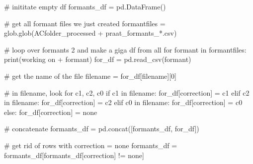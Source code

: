 \documentclass[
  letterpaper,
  DIV=11,
  numbers=noendperiod]{scrreprt}
\newenvironment{Shaded}{\begin{snugshade}}{\end{snugshade}}
\newcommand{\BuiltInTok}[1]{\textcolor[rgb]{0.00,0.23,0.31}{#1}}
\newcommand{\CommentTok}[1]{\textcolor[rgb]{0.37,0.37,0.37}{#1}}
\newcommand{\ControlFlowTok}[1]{\textcolor[rgb]{0.00,0.23,0.31}{#1}}
\newcommand{\DecValTok}[1]{\textcolor[rgb]{0.68,0.00,0.00}{#1}}
\newcommand{\KeywordTok}[1]{\textcolor[rgb]{0.00,0.23,0.31}{#1}}
\newcommand{\NormalTok}[1]{\textcolor[rgb]{0.00,0.23,0.31}{#1}}
\newcommand{\OperatorTok}[1]{\textcolor[rgb]{0.37,0.37,0.37}{#1}}
\newcommand{\StringTok}[1]{\textcolor[rgb]{0.13,0.47,0.30}{#1}}
\begin{document}
\begin{Shaded}
\begin{Highlighting}[]
\CommentTok{\# inititate empty df}
\NormalTok{formants\_df }\OperatorTok{=}\NormalTok{ pd.DataFrame()}

\CommentTok{\# get all formant files we just created}
\NormalTok{formantfiles }\OperatorTok{=}\NormalTok{ glob.glob(ACfolder\_processed }\OperatorTok{+} \StringTok{\textquotesingle{}praat\_formants\_*.csv\textquotesingle{}}\NormalTok{)}

\CommentTok{\# loop over formants 2 and make a giga df from all}
\ControlFlowTok{for}\NormalTok{ formant }\KeywordTok{in}\NormalTok{ formantfiles:}
    \BuiltInTok{print}\NormalTok{(}\StringTok{\textquotesingle{}working on \textquotesingle{}} \OperatorTok{+}\NormalTok{ formant)}
\NormalTok{    for\_df }\OperatorTok{=}\NormalTok{ pd.read\_csv(formant)}

    \CommentTok{\# get the name of the file}
\NormalTok{    filename }\OperatorTok{=}\NormalTok{ for\_df[}\StringTok{\textquotesingle{}filename\textquotesingle{}}\NormalTok{][}\DecValTok{0}\NormalTok{]}

    \CommentTok{\# in filename, look for c1, c2, c0}
    \ControlFlowTok{if} \StringTok{\textquotesingle{}c1\textquotesingle{}} \KeywordTok{in}\NormalTok{ filename:}
\NormalTok{        for\_df[}\StringTok{\textquotesingle{}correction\textquotesingle{}}\NormalTok{] }\OperatorTok{=} \StringTok{\textquotesingle{}c1\textquotesingle{}}
    \ControlFlowTok{elif} \StringTok{\textquotesingle{}c2\textquotesingle{}} \KeywordTok{in}\NormalTok{ filename:}
\NormalTok{        for\_df[}\StringTok{\textquotesingle{}correction\textquotesingle{}}\NormalTok{] }\OperatorTok{=} \StringTok{\textquotesingle{}c2\textquotesingle{}}
    \ControlFlowTok{elif} \StringTok{\textquotesingle{}c0\textquotesingle{}} \KeywordTok{in}\NormalTok{ filename:}
\NormalTok{        for\_df[}\StringTok{\textquotesingle{}correction\textquotesingle{}}\NormalTok{] }\OperatorTok{=} \StringTok{\textquotesingle{}c0\textquotesingle{}}
    \ControlFlowTok{else}\NormalTok{:}
\NormalTok{        for\_df[}\StringTok{\textquotesingle{}correction\textquotesingle{}}\NormalTok{] }\OperatorTok{=} \StringTok{\textquotesingle{}none\textquotesingle{}}
    
    \CommentTok{\# concatenate}
\NormalTok{    formants\_df }\OperatorTok{=}\NormalTok{ pd.concat([formants\_df, for\_df])}

\CommentTok{\# get rid of rows with correction = none}
\NormalTok{formants\_df }\OperatorTok{=}\NormalTok{ formants\_df[formants\_df[}\StringTok{\textquotesingle{}correction\textquotesingle{}}\NormalTok{] }\OperatorTok{!=} \StringTok{\textquotesingle{}none\textquotesingle{}}\NormalTok{]}
\end{Highlighting}
\end{Shaded}
\end{document}

